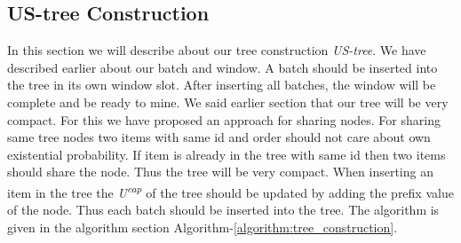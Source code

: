     \subsection{US-tree Construction}
    In this section we will describe about our tree construction \emph{US-tree}. We have described earlier about our batch and window. A batch should be inserted into the tree in its own window slot. After inserting all batches, the window will be complete and be ready to mine. We said earlier section that our tree will be very compact. For this we have proposed an approach for sharing nodes. For sharing same tree nodes two items with same id and order should not care about own existential probability. If item is already in the tree with same id then two items should share the node. Thus the tree will be very compact. When inserting an item in the tree the \emph{U\textsuperscript{cap}} of the tree should be updated by adding the prefix value of the node. Thus each batch should be inserted into the tree. The algorithm is given in the algorithm section Algorithm-\ref{algorithm:tree_construction}.
    
